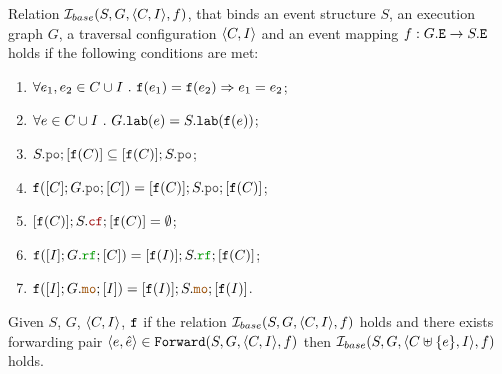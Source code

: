 \documentclass[12pt]{article}
\begin{document}
\begin{definition}
  Relation $\mathcal{I}_{base}(S, G, \langle C, I \rangle, f)$, that binds an 
  event structure $S$, an \imm execution graph $G$,
  a traversal configuration $\langle C, I \rangle$
  and an event mapping $f : G.{\mathtt{E}} \rightarrow S.{\mathtt{E}}$ 
  holds if the following conditions are met:
  \begin{enumerate}[label=\textbf{S.\arabic*}]

    \item \label{item:sim-inj}
      $\forall{e_1, e_2 \in C \cup I} ~.~ {\mathtt{f}}(e_1) = {\mathtt{f}}(e_2) \Rightarrow e_1 = e_2$;

    \item \label{item:sim-lab}
      $\forall{e \in C \cup I} ~.~ G.{\mathtt{lab}}(e) = S.{\mathtt{lab}}({\mathtt{f}}(e))$;

    \item \label{item:sim-po-prfx} 
      $S.\lPO;[\lf(C)] \subseteq [\lf(C)];S.\lPO$;

    \item \label{item:sim-po}
      $\lf([C];G.\lPO;[C]) = [\lf(C)];S.\lPO;[\lf(C)]$;
    
    \item \label{item:sim-cf}
      $[\lf(C)];S.\lCF;[\lf(C)] = \emptyset$;

    \item \label{item:sim-rf}
      $\lf([I];G.\lRF;[C]) = [\lf(I)];S.\lRF;[\lf(C)]$;

    \item \label{item:sim-mo}
      $\lf([I];G.\lMO;[I]) = [\lf(I)];S.\lMO;[\lf(I)]$.
    
  \end{enumerate}
\end{definition}

\begin{lemma}
  \label{lemma:simb-forward}
  Given $S$, $G$, $\langle C, I \rangle$, ${\mathtt{f}}$
  if the relation $\mathcal{I}_{base}(S, G, \langle C, I \rangle, f)$ holds and 
  there exists forwarding pair $\langle e, \hat{e} \rangle \in {\mathtt{Forward}}(S, G, \langle C, I \rangle, f)$
  then $\mathcal{I}_{base}(S, G, \langle C \uplus \{e\}, I \rangle, f)$ holds. 
\end{lemma}
\end{document}
